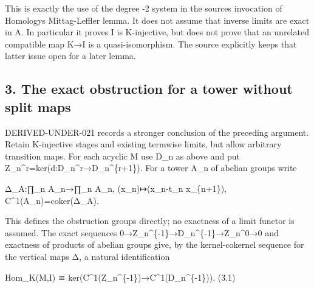 \documentclass[11pt]{article}
\begin{document}
This is exactly the use of the degree -2 system in the source\textquotesingle s invocation of Homology\textquotesingle s Mittag-Leffler lemma. It does not assume that inverse limits are exact in A. In particular it proves I is K-injective,\allowbreak{} but does not prove that an unrelated compatible map K\allowbreak{}→I is a quasi-isomorphism. The source explicitly keeps that latter issue open for a later lemma.

\subsection{3. The exact obstruction for a tower without split maps}\label{proofs-9746-10132-the-exact-obstruction-for-a-tower-without-split-maps}

DERIVED-UNDER-021 records a stronger conclusion of the preceding argument. Retain K-injective stages and existing termwise limits,\allowbreak{} but allow arbitrary transition maps. For each acyclic M use D\_\allowbreak{}n as above and put Z\_\allowbreak{}n\textasciicircum{}r\allowbreak{}=ker(d:\allowbreak{}D\_\allowbreak{}n\textasciicircum{}r\allowbreak{}→D\_\allowbreak{}n\textasciicircum{}\{r\allowbreak{}+1\})\allowbreak{}. For a tower A\_\allowbreak{}n of abelian groups write

Δ\_\allowbreak{}A:\allowbreak{}∏\_\allowbreak{}n A\_\allowbreak{}n\allowbreak{}→∏\_\allowbreak{}n A\_\allowbreak{}n,\allowbreak{} (x\_\allowbreak{}n)\allowbreak{}\allowbreak{}↦(x\_\allowbreak{}n-t\_\allowbreak{}n x\_\allowbreak{}\{n\allowbreak{}+1\})\allowbreak{},\allowbreak{} C\textasciicircum{}1(A\_\allowbreak{}n)\allowbreak{}\allowbreak{}=coker(Δ\_\allowbreak{}A)\allowbreak{}.

This defines the obstruction groups directly; no exactness of a limit functor is assumed. The exact sequences 0\allowbreak{}→Z\_\allowbreak{}n\textasciicircum{}\{-1\}\allowbreak{}→D\_\allowbreak{}n\textasciicircum{}\{-1\}\allowbreak{}→Z\_\allowbreak{}n\textasciicircum{}0\allowbreak{}→0 and exactness of products of abelian groups give,\allowbreak{} by the kernel-cokernel sequence for the vertical maps Δ,\allowbreak{} a natural identification

Hom\_\allowbreak{}K(M,\allowbreak{}I)\allowbreak{} ≅ ker(C\textasciicircum{}1(Z\_\allowbreak{}n\textasciicircum{}\{-1\})\allowbreak{}\allowbreak{}→C\textasciicircum{}1(D\_\allowbreak{}n\textasciicircum{}\{-1\})\allowbreak{})\allowbreak{}. (3.1)\allowbreak{}
\end{document}
